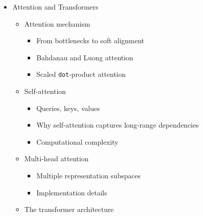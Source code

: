 \documentclass[
]{article}
\providecommand{\tightlist}{%
  \setlength{\itemsep}{0pt}\setlength{\parskip}{0pt}}
\begin{document}
\begin{itemize}
\begin{itemize}
    \begin{itemize}
    \tightlist
    \item
      \texttt{BiLSTM} and information from the future
    \item
      Use cases and limitations
    \end{itemize}
  \item
    Encoder-decoder architectures

    \begin{itemize}
    \tightlist
    \item
      Sequence-to-sequence framing
    \item
      Bottleneck problem
    \item
      The setup for attention
    \end{itemize}
  \end{itemize}
\item
  Attention and Transformers

  \begin{itemize}
  \tightlist
  \item
    Attention mechanism

    \begin{itemize}
    \tightlist
    \item
      From bottlenecks to soft alignment
    \item
      Bahdanau and Luong attention
    \item
      Scaled \texttt{dot}-product attention
    \end{itemize}
  \item
    Self-attention

    \begin{itemize}
    \tightlist
    \item
      Queries, keys, values
    \item
      Why self-attention captures long-range dependencies
    \item
      Computational complexity
    \end{itemize}
  \item
    Multi-head attention

    \begin{itemize}
    \tightlist
    \item
      Multiple representation subspaces
    \item
      Implementation details
    \end{itemize}
  \item
    The transformer architecture


\end{itemize}
\end{itemize}
\end{document}
